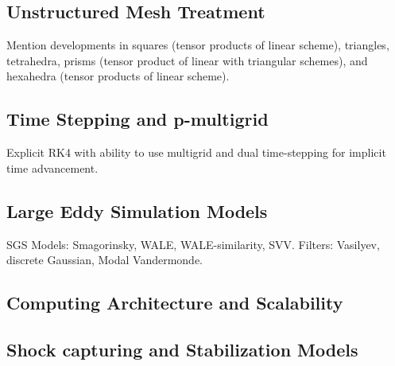 

\subsection{Unstructured Mesh Treatment}
Mention developments in squares (tensor products of linear scheme), triangles\cite{castonguay2012new,williams2013tri}, tetrahedra\cite{williams2013tet}, prisms (tensor product of linear with triangular schemes), and hexahedra (tensor products of linear scheme).

\subsection{Time Stepping and p-multigrid}
Explicit RK4 with ability to use multigrid\cite{fidkowski2005p} and dual time-stepping\cite{Jameson1991DualTime} for implicit time advancement.


\subsection{Large Eddy Simulation Models}
SGS Models: Smagorinsky\cite{smagorinsky1963}, WALE\cite{nicoud1999}, WALE-similarity\cite{lodato2009}, SVV\cite{karamanos2000}.
Filters: Vasilyev\cite{vasilyev1998,vasilyev2001}, discrete Gaussian\cite{lodato2012b}, Modal Vandermonde\cite{blackburn2003}.

\subsection{Computing Architecture and Scalability}


\subsection{Shock capturing and Stabilization Models}
